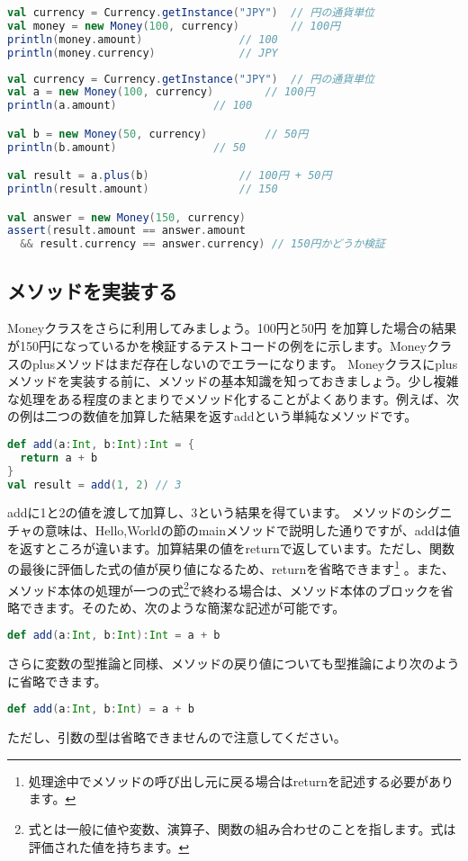 \begin{lstlisting}[language=scala, label=src:money_100yen, caption=100円を表すコード]
val currency = Currency.getInstance("JPY")	// 円の通貨単位
val money = new Money(100, currency)		// 100円
println(money.amount)				// 100
println(money.currency)				// JPY 
\end{lstlisting}

\begin{lstlisting}[language=scala, label=src:money_test, caption=100円と50円を加算した結果が150円になっているかを検証するテストコード。Moneyクラスのplusメソッドはまだ存在しないので実行するとエラーになる]
val currency = Currency.getInstance("JPY")	// 円の通貨単位
val a = new Money(100, currency)		// 100円
println(a.amount)				// 100

val b = new Money(50, currency)			// 50円
println(b.amount)				// 50

val result = a.plus(b)				// 100円 + 50円
println(result.amount)				// 150

val answer = new Money(150, currency)
assert(result.amount == answer.amount 
  && result.currency == answer.currency) // 150円かどうか検証 
\end{lstlisting}

\subsection{メソッドを実装する}
Moneyクラスをさらに利用してみましょう。100円と50円 を加算した場合の結果が150円になっているかを検証するテストコードの例をに示します。Moneyクラスのplusメソッドはまだ存在しないのでエラーになります。 Moneyクラスにplusメソッドを実装する前に、メソッドの基本知識を知っておきましょう。少し複雑な処理をある程度のまとまりでメソッド化することがよくあります。例えば、次の例は二つの数値を加算した結果を返すaddという単純なメソッドです。 
\begin{lstlisting}[language=scala, frame=none]
def add(a:Int, b:Int):Int = {
  return a + b
}
val result = add(1, 2) // 3
\end{lstlisting}
addに1と2の値を渡して加算し、3という結果を得ています。 メソッドのシグニチャの意味は、Hello,Worldの節のmainメソッドで説明した通りですが、addは値を返すところが違います。加算結果の値をreturnで返しています。ただし、関数の最後に評価した式の値が戻り値になるため、returnを省略できます\footnote{処理途中でメソッドの呼び出し元に戻る場合はreturnを記述する必要があります。} 。また、メソッド本体の処理が一つの式\footnote{式とは一般に値や変数、演算子、関数の組み合わせのことを指します。式は評価された値を持ちます。}で終わる場合は、メソッド本体のブロックを省略できます。そのため、次のような簡潔な記述が可能です。
\begin{lstlisting}[language=scala, frame=none]
def add(a:Int, b:Int):Int = a + b
\end{lstlisting}
さらに変数の型推論と同様、メソッドの戻り値についても型推論により次のように省略できます。
\begin{lstlisting}[language=scala, frame=none]
def add(a:Int, b:Int) = a + b
\end{lstlisting}
ただし、引数の型は省略できませんので注意してください。 

